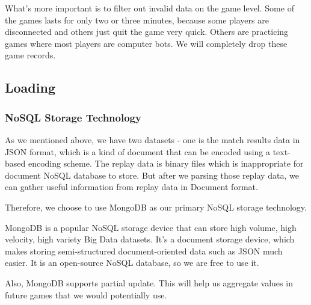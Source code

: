 \documentclass{article}
\begin{document}
What's more important is to filter out invalid data on the game level. Some of the games lasts for only two or three minutes, because some players are disconnected and others just quit the game very quick. Others are practicing games where most players are computer bots. We will completely drop these game records.









\subsection{Loading}

\subsubsection{NoSQL Storage Technology}

As we mentioned above, we have two datasets - one is the match results data in JSON format, which is a kind of document that can be encoded using a text-based encoding scheme.
The replay data is binary files which is inappropriate for document NoSQL database to store.
But after we parsing those replay data, we can gather useful information from replay data in Document format.

Therefore, we choose to use MongoDB as our primary NoSQL storage technology.

MongoDB is a popular NoSQL storage device that can store high volume, high velocity, high variety Big Data datasets.
It's a document storage device, which makes storing semi-structured document-oriented data such as JSON much easier.
It is an open-source NoSQL database, so we are free to use it.

Also, MongoDB supports partial update.
This will help us aggregate values in future games that we would potentially use.
\end{document}
